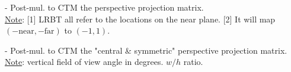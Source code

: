 \documentclass[10pt,landscape,letterpaper]{article}
\begin{document}
\begin{multicols}{3}
 - Post-mul. to CTM the perspective projection matrix.
\\
\underline{Note}: [1] LRBT all refer to the locations on the near plane. [2] It will map $(-\text{near}, -\text{far})$ to $(-1, 1)$.

 - Post-mul. to CTM the "central \& symmetric" perspective projection matrix.
\\
\underline{Note}:  vertical field of view angle in degrees.  $w / h$ ratio.





\end{multicols}
\end{document}
